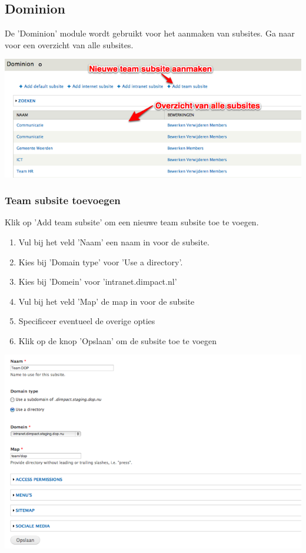 \subsection{Dominion}\label{dominion}
De 'Dominion' module wordt gebruikt voor het aanmaken van subsites. Ga naar  voor een overzicht van alle subsites. 


\bigskip

\begin{center}
	\includegraphics[width=\textwidth]{img/dominion1.png}
\end{center}


\subsubsection{Team subsite toevoegen}\label{teamsubsitetoevoegen}
Klik op 'Add team subsite' om een nieuwe team subsite toe te voegen. 

\begin{enumerate}
\item Vul bij het veld 'Naam' een naam in voor de subsite.
\item Kies bij 'Domain type' voor 'Use a directory'.
\item Kies bij 'Domein' voor 'intranet.dimpact.nl'
\item Vul bij het veld 'Map' de map in voor de subsite
\item Specificeer eventueel de overige opties
\item Klik op de knop 'Opslaan' om de subsite toe te voegen 
\end{enumerate}

\bigskip

\begin{center}
	\includegraphics[width=\textwidth]{img/dominion2.png}
\end{center}

